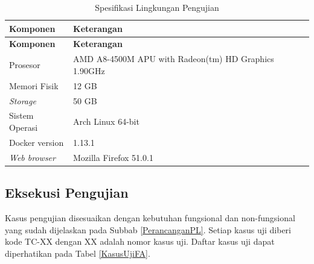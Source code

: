 	\begin{small}
	\begin{longtable}{ | p{3cm} | p{9cm} | }
	    \caption{Spesifikasi Lingkungan Pengujian}
	    \label{LingPengujian}\\ \hline
	    \centering\bfseries{Komponen} & \centering\bfseries{Keterangan} \tabularnewline \hline
	    \endfirsthead
	    \hline
	    \centering\bfseries{Komponen} & \centering\bfseries{Keterangan} \tabularnewline \hline
	    \endhead
		Prosesor & AMD A8-4500M APU with Radeon(tm) HD Graphics 1.90GHz\\ \hline
		Memori Fisik & 12 GB\\ \hline
		\textit{Storage} & 50 GB\\ \hline
		Sistem Operasi & Arch Linux 64-bit\\ \hline
		Docker version & 1.13.1\\ \hline
		\textit{Web browser} & Mozilla Firefox 51.0.1\\ \hline
	\end{longtable}
	\end{small}

	\subsection{Eksekusi Pengujian}
	Kasus pengujian disesuaikan dengan kebutuhan fungsional dan non-fungsional yang sudah dijelaskan pada Subbab \ref{PerancanganPL}. Setiap kasus uji diberi kode TC-XX dengan XX adalah nomor kasus uji. Daftar kasus uji dapat diperhatikan pada Tabel \ref{KasusUjiFA}.

